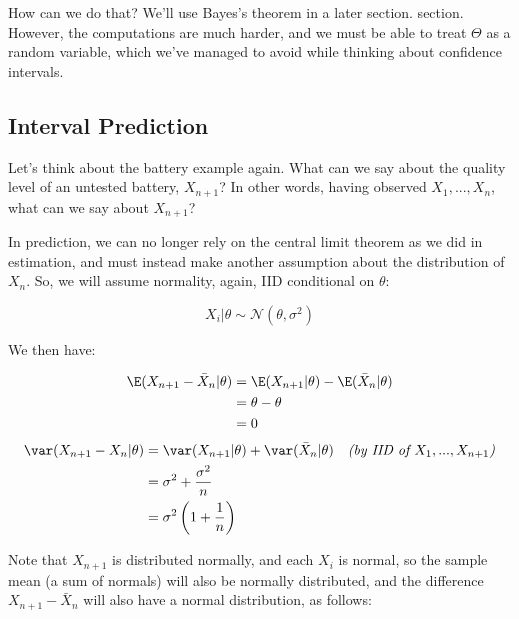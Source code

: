\documentclass[a4paper]{article}
\begin{document}
                How can we do that? We'll use Bayes's theorem in a later section.
                section. However, the computations are much harder, and we must
                be able to treat $\Theta$ as a random variable, which we've
                managed to avoid while thinking about confidence intervals.

        \subsection{Interval Prediction}
            \begin{fread}
                [MR03, section 8.6]
            \end{fread}

            Let's think about the battery example again. What can we say about
            the quality level of an untested battery, $X_{n+1}$? In other words,
            having observed $X_1, ..., X_n$, what can we say about $X_{n+1}$?

            In prediction, we can no longer rely on the central limit theorem as
            we did in estimation, and must instead make another assumption about
            the distribution of $X_n$. So, we will assume normality, again, IID
            conditional on $\theta$:

            \[
                X_i | \theta \sim \mathcal{N}(\theta, \sigma^2)
            \]

            We then have:

            \begin{align*}
                \E(X_{n + 1} - \bar X_n | \theta) & = \E(X_{n + 1} | \theta) -
                    \E(\bar X_n | \theta) \\
                & = \theta - \theta \\
                & = 0
            \end{align*}
            \begin{align*}
                \var(X_{n + 1} - X_n | \theta) & = \var(X_{n + 1} | \theta) +
                    \var(\bar X_n | \theta) & \textit{(by IID of $X_1, ...,
                    X_{n+1}$)} \\
                & = \sigma^2 + \frac{\sigma^2}{n} \\
                & = \sigma^2 \left(1 + \frac{1}{n}\right)
            \end{align*}

            Note that $X_{n + 1}$ is distributed normally, and each $X_i$ is
            normal, so the sample mean (a sum of normals) will also be normally
            distributed, and the difference $X_{n + 1} - \bar X_n$ will also
            have a normal distribution, as follows:
\end{document}
